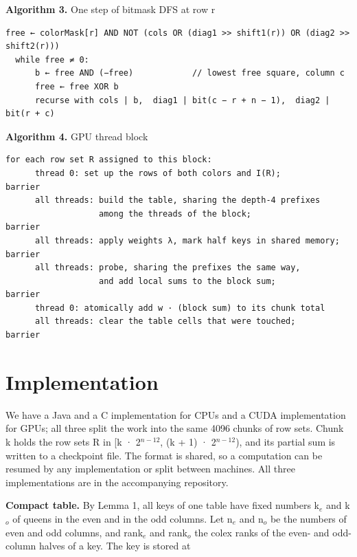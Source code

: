 \begin{algobox}
\noindent\textbf{Algorithm 3.} One step of bitmask DFS at row r\par\smallskip
\begin{Verbatim}[fontsize=\small]
  free ← colorMask[r] AND NOT (cols OR (diag1 >> shift1(r)) OR (diag2 >> shift2(r)))
  while free ≠ 0:
      b ← free AND (−free)            // lowest free square, column c
      free ← free XOR b
      recurse with cols | b,  diag1 | bit(c − r + n − 1),  diag2 | bit(r + c)
\end{Verbatim}
\end{algobox}

\begin{algobox}
\noindent\textbf{Algorithm 4.} GPU thread block\par\smallskip
\begin{Verbatim}[fontsize=\small]
  for each row set R assigned to this block:
      thread 0: set up the rows of both colors and I(R);           barrier
      all threads: build the table, sharing the depth-4 prefixes
                   among the threads of the block;                barrier
      all threads: apply weights λ, mark half keys in shared memory; barrier
      all threads: probe, sharing the prefixes the same way,
                   and add local sums to the block sum;           barrier
      thread 0: atomically add w · (block sum) to its chunk total
      all threads: clear the table cells that were touched;       barrier
\end{Verbatim}
\end{algobox}

\section{Implementation}

We have a Java and a C implementation for CPUs and a CUDA implementation for GPUs; all three split the work into the same 4096 chunks of row sets. Chunk k holds the row sets R in [k · 2$^{n-12}$, (k + 1) · 2$^{n-12}$), and its partial sum is written to a checkpoint file. The format is shared, so a computation can be resumed by any implementation or split between machines. All three implementations are in the accompanying repository.

\textbf{Compact table.} By Lemma 1, all keys of one table have fixed numbers k$_{e}$ and k$_{o}$ of queens in the even and in the odd columns. Let n$_{e}$ and n$_{o}$ be the numbers of even and odd columns, and rank$_{e}$ and rank$_{o}$ the colex ranks of the even- and odd-column halves of a key. The key is stored at

